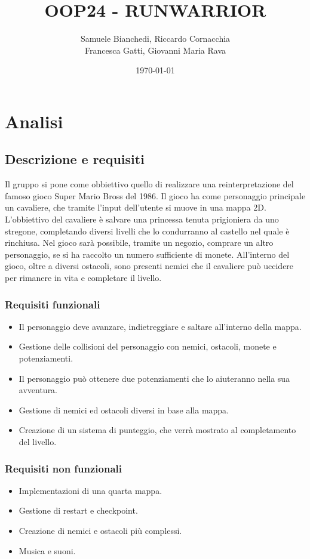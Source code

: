 \documentclass[a4paper,12pt]{report}
\title{OOP24 - RUNWARRIOR}
\author{
    Samuele Bianchedi, Riccardo Cornacchia\\
    Francesca Gatti, Giovanni Maria Rava}
\date{\today}
\begin{document}
\maketitle
\tableofcontents
\chapter{Analisi}
\section{Descrizione e requisiti}
Il gruppo si pone come obbiettivo quello di realizzare una reinterpretazione del famoso gioco 
Super Mario Bross del 1986. Il gioco ha come personaggio principale un cavaliere, che tramite 
l'input dell'utente si muove in una mappa 2D. L'obbiettivo del cavaliere è salvare una princessa tenuta
prigioniera da uno stregone, completando diversi livelli che lo condurranno al castello nel quale è 
rinchiusa. Nel gioco sarà possibile, tramite un negozio, comprare un altro personaggio, se si ha raccolto un numero sufficiente di monete.
All'interno del gioco, oltre a diversi ostacoli, sono presenti nemici che il cavaliere può uccidere per rimanere in vita e 
completare il livello. 
\subsection*{Requisiti funzionali}
\begin{itemize}
    \item Il personaggio deve avanzare, indietreggiare e saltare all'interno della mappa.
    \item Gestione delle collisioni del personaggio con nemici, ostacoli, monete e potenziamenti.
    \item Il personaggio può ottenere due potenziamenti che lo aiuteranno nella sua avventura.
    \item Gestione di nemici ed ostacoli diversi in base alla mappa.
    \item Creazione di un sistema di punteggio, che verrà mostrato al completamento del livello.
\end{itemize}
\newpage
\subsection*{Requisiti non funzionali}
\begin{itemize}
    \item Implementazioni di una quarta mappa. 
    \item Gestione di restart e checkpoint.
    \item Creazione di nemici e ostacoli più complessi.
    \item Musica e suoni. 
\end{itemize}
\end{document}
